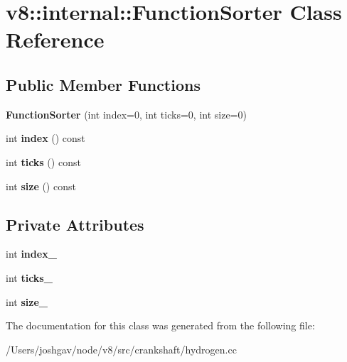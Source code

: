 \hypertarget{classv8_1_1internal_1_1_function_sorter}{}\section{v8\+:\+:internal\+:\+:Function\+Sorter Class Reference}
\label{classv8_1_1internal_1_1_function_sorter}
\subsection*{Public Member Functions}
\begin{DoxyCompactItemize}
\item 
{\bfseries Function\+Sorter} (int index=0, int ticks=0, int size=0)\hypertarget{classv8_1_1internal_1_1_function_sorter_afdc7d5a50d84bc201e4ae336ea784b32}{}\label{classv8_1_1internal_1_1_function_sorter_afdc7d5a50d84bc201e4ae336ea784b32}

\item 
int {\bfseries index} () const \hypertarget{classv8_1_1internal_1_1_function_sorter_a3f3707866f45a4bdfffa73f1330fe381}{}\label{classv8_1_1internal_1_1_function_sorter_a3f3707866f45a4bdfffa73f1330fe381}

\item 
int {\bfseries ticks} () const \hypertarget{classv8_1_1internal_1_1_function_sorter_a680d7d90ec3d9c7e82ffa20bb31e3127}{}\label{classv8_1_1internal_1_1_function_sorter_a680d7d90ec3d9c7e82ffa20bb31e3127}

\item 
int {\bfseries size} () const \hypertarget{classv8_1_1internal_1_1_function_sorter_a2b10c04d4ae0c5f007907aa9ed5ed05b}{}\label{classv8_1_1internal_1_1_function_sorter_a2b10c04d4ae0c5f007907aa9ed5ed05b}

\end{DoxyCompactItemize}
\subsection*{Private Attributes}
\begin{DoxyCompactItemize}
\item 
int {\bfseries index\+\_\+}\hypertarget{classv8_1_1internal_1_1_function_sorter_abb601ad6bf2b35223e00018a32d15b75}{}\label{classv8_1_1internal_1_1_function_sorter_abb601ad6bf2b35223e00018a32d15b75}

\item 
int {\bfseries ticks\+\_\+}\hypertarget{classv8_1_1internal_1_1_function_sorter_ae76f4398f0727ccb3681350ff351b8fb}{}\label{classv8_1_1internal_1_1_function_sorter_ae76f4398f0727ccb3681350ff351b8fb}

\item 
int {\bfseries size\+\_\+}\hypertarget{classv8_1_1internal_1_1_function_sorter_ab4e8056af3355c12239051c35064dae2}{}\label{classv8_1_1internal_1_1_function_sorter_ab4e8056af3355c12239051c35064dae2}

\end{DoxyCompactItemize}


The documentation for this class was generated from the following file\+:\begin{DoxyCompactItemize}
\item 
/\+Users/joshgav/node/v8/src/crankshaft/hydrogen.\+cc\end{DoxyCompactItemize}
